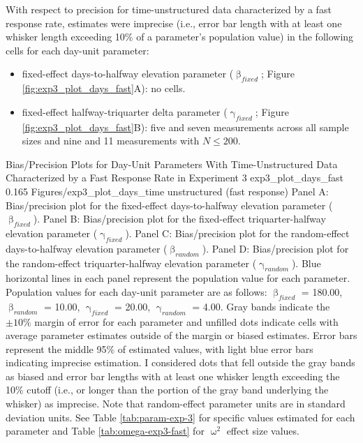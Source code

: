 \documentclass[
12pt, %
twoside,
english]{guelphthesis}
\begin{document}
With respect to precision for time-unstructured data characterized by a fast response rate, estimates were imprecise (i.e., error bar length with at least one whisker length exceeding 10\% of a parameter's population value) in the following cells for each day-unit parameter:
\begin{itemize}
\tightlist
\item
  fixed-effect days-to-halfway elevation parameter (\(\upbeta_{fixed}\); Figure \ref{fig:exp3_plot_days_fast}A): no cells.
\item
  fixed-effect halfway-triquarter delta parameter (\(\upgamma_{fixed}\); Figure \ref{fig:exp3_plot_days_fast}B): five and seven measurements across all sample sizes and nine and 11 measurements with \(N \le 200\).
\end{itemize}
\begin{apaFigure}
[portrait]
[samepage]
[-0.2cm]
{Bias/Precision Plots for Day-Unit Parameters With Time-Unstructured Data Characterized by a Fast Response Rate in Experiment 3}
{exp3_plot_days_fast}
{0.165}
{Figures/exp3_plot_days_time unstructured (fast response)}
{Panel A: Bias/precision plot for the fixed-effect days-to-halfway elevation parameter ($\upbeta_{fixed}$). Panel B: Bias/precision plot for the fixed-effect triquarter-halfway elevation parameter ($\upgamma_{fixed}$). Panel C: Bias/precision plot for the random-effect days-to-halfway elevation parameter ($\upbeta_{random}$). Panel D: Bias/precision plot for the random-effect triquarter-halfway elevation parameter ($\upgamma_{random}$). Blue horizontal lines in each panel represent the population value for each parameter. Population values for each day-unit parameter are as follows: $\upbeta_{fixed}$ = 180.00, $\upbeta_{random}$ = 10.00, $\upgamma_{fixed}$ = 20.00, $\upgamma_{random}$ = 4.00. Gray bands indicate the $\pm 10\%$ margin of error for each parameter and unfilled dots indicate cells with average parameter estimates outside of the margin or biased estimates. Error bars represent the middle 95\% of estimated values, with light blue error bars indicating imprecise estimation. I considered dots that fell outside the gray bands as biased and error bar lengths with at least one whisker length exceeding the 10\% cutoff (i.e., or longer than the portion of the gray band underlying the whisker) as imprecise. Note that random-effect parameter units are in standard deviation units. See Table \ref{tab:param-exp-3} for specific values estimated for each parameter and Table \ref{tab:omega-exp3-fast} for $\upomega^2$ effect size values.}
\end{apaFigure}
\end{document}
